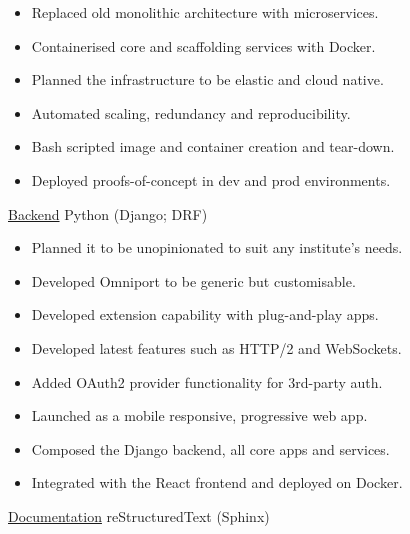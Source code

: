 \begin{sectiondescription}
  \begin{itemize}[nosep, leftmargin = *]
    \item Replaced old monolithic architecture with microservices.
    \item Containerised core and scaffolding services with Docker.
    \item Planned the infrastructure to be elastic and cloud native.
    \item Automated scaling, redundancy and reproducibility.
    \item Bash scripted image and container creation and tear-down.
    \item Deployed proofs-of-concept in dev and prod environments.
  \end{itemize}
\end{sectiondescription}

\projectsubsubsection
  {\href{https://github.com/IMGIITRoorkee/omniport-backend/}{Backend}}
  {Python (Django; DRF)}

\begin{sectiondescription}
  \begin{itemize}[nosep, leftmargin = *]
    \item Planned it to be unopinionated to suit any institute's needs.
    \item Developed Omniport to be generic but customisable.
    \item Developed extension capability with plug-and-play apps.
    \item Developed latest features such as HTTP/2 and WebSockets.
    \item Added OAuth2 provider functionality for 3rd-party auth.
    \item Launched as a mobile responsive, progressive web app.
    \item Composed the Django backend, all core apps and services.
    \item Integrated with the React frontend and deployed on Docker.
  \end{itemize}
\end{sectiondescription}

\projectsubsubsection
  {\href{https://github.com/IMGIITRoorkee/omniport-docs/}{Documentation}}
  {reStructuredText (Sphinx)}


